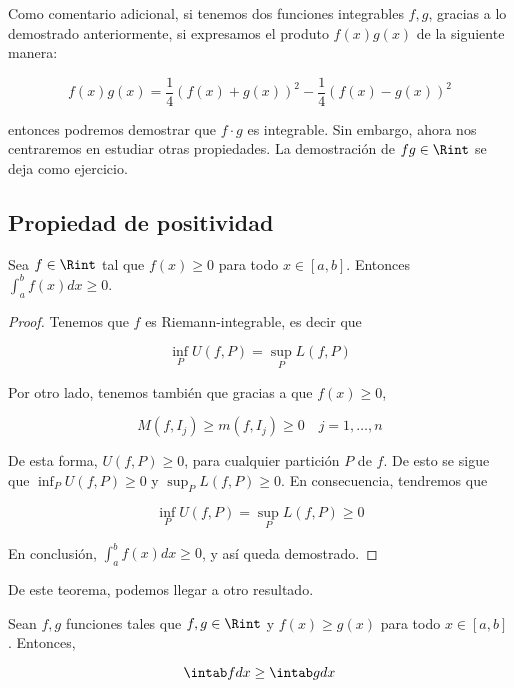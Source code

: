 
Como comentario adicional, si tenemos dos funciones integrables $f, g$, gracias a lo demostrado anteriormente, si expresamos el produto $f(x)g(x)$ de la siguiente manera:

\[
f(x)g(x) = \frac{1}{4}(f(x) + g(x))^2 - \frac{1}{4}(f(x) - g(x))^2
\]

\noindent entonces podremos demostrar que $f \cdot g$ es integrable. Sin embargo, ahora nos centraremos en estudiar otras propiedades. La demostración de $fg \in \Rint$ se deja como ejercicio.

\subsection{Propiedad de positividad}

\begin{teo}\label{teo:pos}
    Sea $f \in \Rint$ tal que $f(x) \geq 0$ para todo $x \in [a,b]$. Entonces $\int_a^b f(x)dx \geq 0$.
\end{teo}

\begin{proof}
    Tenemos que $f$ es Riemann-integrable, es decir que
    
    \[
    \inf_P U(f, P) = \sup_P L(f, P)
    \]
    
    Por otro lado, tenemos también que gracias a que $f(x) \geq 0$,
    
    \[
    M(f, I_j) \geq m(f, I_j) \geq 0 \quad j = 1, \dots, n
    \]
    
    De esta forma, $U(f, P) \geq 0$, para cualquier partición $P$ de $f$. De esto se sigue que $\inf_P U(f,P) \geq 0$ y $\sup_P L(f,P) \geq 0$. En consecuencia, tendremos que
    
    \[
    \inf_P U(f,P) = \sup_P L(f,P) \geq 0
    \]
    
    En conclusión, $\int_a^b f(x)dx \geq 0$, y así queda demostrado.
\end{proof}

De este teorema, podemos llegar a otro resultado.

\begin{cor}
    Sean $f, g$ funciones tales que $f, g \in \Rint$ y $f(x) \geq g(x)$ para todo $x \in [a,b]$. Entonces,
    
    \[
    \intab fdx \geq \intab gdx
    \]
\end{cor}

